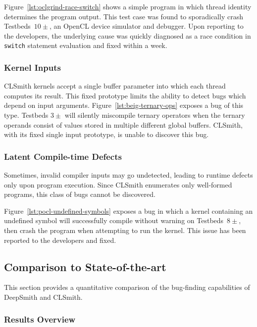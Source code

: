 Figure~\ref{lst:oclgrind-race-switch} shows a simple program in which thread identity determines the program output. This test case was found to sporadically crash Testbeds~$10\pm$, an OpenCL device simulator and debugger. Upon reporting to the developers, the underlying cause was quickly diagnosed as a race condition in \texttt{switch} statement evaluation and fixed within a week.


\subsubsection{Kernel Inputs}

CLSmith kernels accept a single buffer parameter into which each thread computes its result. This fixed prototype limits the ability to detect bugs which depend on input arguments. Figure~\ref{lst:beig-ternary-ops} exposes a bug of this type. Testbeds $3\pm$ will silently miscompile ternary operators when the ternary operands consist of values stored in multiple different global buffers. CLSmith, with its fixed single input prototype, is unable to discover this bug.


\subsubsection{Latent Compile-time Defects}

Sometimes, invalid compiler inputs may go undetected, leading to runtime defects only upon program execution. Since CLSmith enumerates only well-formed programs, this class of bugs cannot be discovered.

Figure~\ref{lst:pocl-undefined-symbols} exposes a bug in which a kernel containing an undefined symbol will successfully compile without warning on Testbeds~$8\pm$, then crash the program when attempting to run the kernel. This issue has been reported to the developers and fixed.


\subsection{Comparison to State-of-the-art}

This section provides a quantitative comparison of the bug-finding capabilities of DeepSmith and CLSmith.


\subsubsection{Results Overview}


